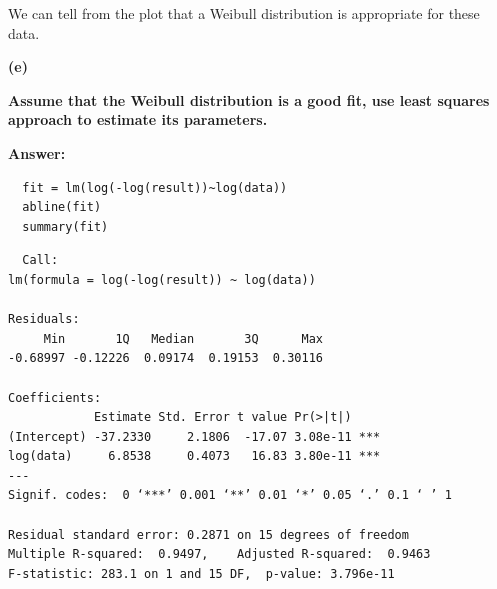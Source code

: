 \documentclass[letterpaper,11pt]{article}
\begin{document}
\begin{center} 
\end{center}
We can tell from the plot that a Weibull distribution is appropriate for these data.

\begin{addmargin}[-1.1em]{0em}
  \textbf{(e)}\par
\end{addmargin}
\textbf{Assume that the Weibull distribution is a good fit, use least squares approach to estimate its parameters.}\par
\bigbreak
\begin{addmargin}[-0.5em]{0em}
  \textbf{Answer: }
\end{addmargin}

\begin{lstlisting}
  fit = lm(log(-log(result))~log(data))
  abline(fit)
  summary(fit)
\end{lstlisting}

\begin{lstlisting}
  Call:
lm(formula = log(-log(result)) ~ log(data))

Residuals:
     Min       1Q   Median       3Q      Max
-0.68997 -0.12226  0.09174  0.19153  0.30116

Coefficients:
            Estimate Std. Error t value Pr(>|t|)
(Intercept) -37.2330     2.1806  -17.07 3.08e-11 ***
log(data)     6.8538     0.4073   16.83 3.80e-11 ***
---
Signif. codes:  0 ‘***’ 0.001 ‘**’ 0.01 ‘*’ 0.05 ‘.’ 0.1 ‘ ’ 1

Residual standard error: 0.2871 on 15 degrees of freedom
Multiple R-squared:  0.9497,	Adjusted R-squared:  0.9463
F-statistic: 283.1 on 1 and 15 DF,  p-value: 3.796e-11
\end{lstlisting}
\end{document}
